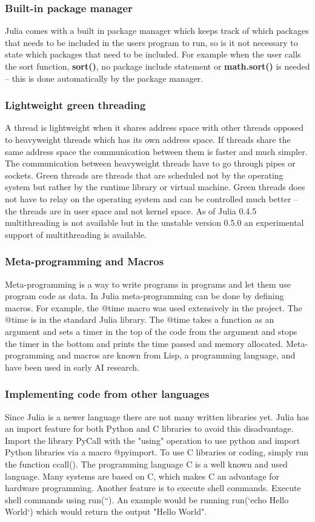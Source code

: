 \documentclass[a4paper,11pt]{article}
\begin{document}
\subsubsection{Built-in package manager}
Julia comes with a built in package manager which keeps track of which packages that needs to be included in the users program to run, so is it not necessary to state which packages that need to be included. For example when the user calls the sort function, \textbf{sort()}, no package include statement or \textbf{math.sort()} is needed – this is done automatically by the package manager.

\subsubsection{Lightweight green threading}
A thread is lightweight when it shares address space with other threads opposed to heavyweight threads which has its own address space. If threads share the same address space the communication between them is faster and much simpler. The communication between heavyweight threads have to go through pipes or sockets. Green threads are threads that are scheduled not by the operating system but rather by the runtime library or virtual machine. Green threads does not have to relay on the operating system and can be controlled much better – the threads are in user space and not kernel space. As of Julia 0.4.5 multithreading is not available but in the unstable version 0.5.0 an experimental support of multithreading is available. 

\subsubsection{Meta-programming and Macros}
Meta-programming is a way to write programs in programs and let them use program code as data. In Julia meta-programming can be done by defining macros. For example, the @time macro was used extensively in the project. The @time is in the standard Julia library. The @time takes a function as an argument and sets a timer in the top of the code from the argument and stops the timer in the bottom and prints the time passed and memory allocated. Meta-programming and macros are known from Lisp, a programming language, and have been used in early AI research. 

\subsubsection{Implementing code from other languages}
Since Julia is a newer language there are not many written libraries yet. Julia has an import feature for both Python and C libraries to avoid this disadvantage. Import the library PyCall with the "using" operation to use python and import Python libraries via a macro @pyimport. To use C libraries or coding, simply run the function ccall(). The programming language C is a well known and used language. Many systems are based on C, which makes C an advantage for hardware programming. Another feature is to execute shell commands. Execute shell commands using run(``). An example would be running run(`echo Hello World`) which would return the output "Hello World".
\end{document}
